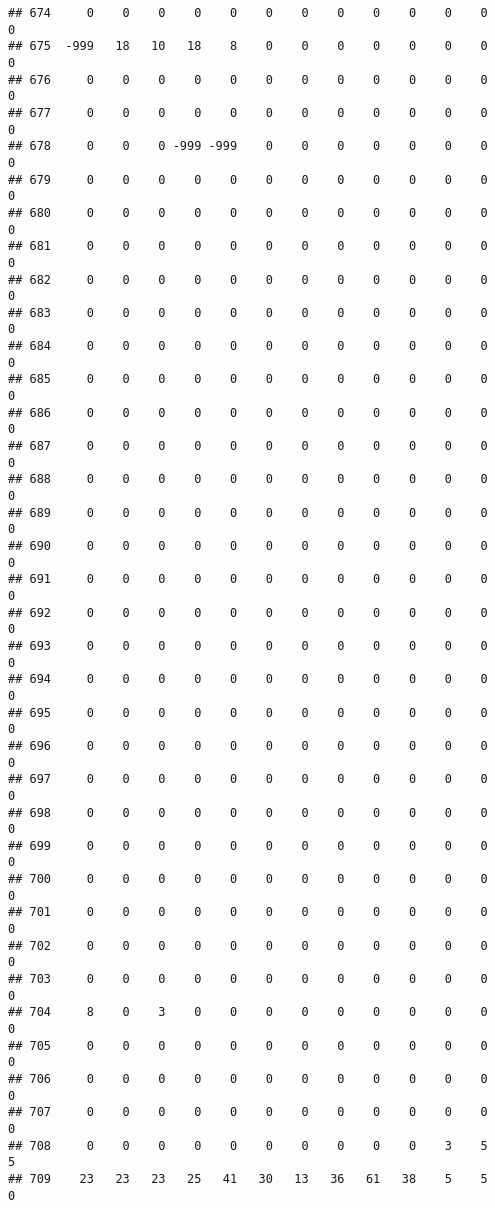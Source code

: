 \documentclass[]{article}
\begin{document}
\begin{verbatim}
## 674     0    0    0    0    0    0    0    0    0    0    0    0    0
## 675  -999   18   10   18    8    0    0    0    0    0    0    0    0
## 676     0    0    0    0    0    0    0    0    0    0    0    0    0
## 677     0    0    0    0    0    0    0    0    0    0    0    0    0
## 678     0    0    0 -999 -999    0    0    0    0    0    0    0    0
## 679     0    0    0    0    0    0    0    0    0    0    0    0    0
## 680     0    0    0    0    0    0    0    0    0    0    0    0    0
## 681     0    0    0    0    0    0    0    0    0    0    0    0    0
## 682     0    0    0    0    0    0    0    0    0    0    0    0    0
## 683     0    0    0    0    0    0    0    0    0    0    0    0    0
## 684     0    0    0    0    0    0    0    0    0    0    0    0    0
## 685     0    0    0    0    0    0    0    0    0    0    0    0    0
## 686     0    0    0    0    0    0    0    0    0    0    0    0    0
## 687     0    0    0    0    0    0    0    0    0    0    0    0    0
## 688     0    0    0    0    0    0    0    0    0    0    0    0    0
## 689     0    0    0    0    0    0    0    0    0    0    0    0    0
## 690     0    0    0    0    0    0    0    0    0    0    0    0    0
## 691     0    0    0    0    0    0    0    0    0    0    0    0    0
## 692     0    0    0    0    0    0    0    0    0    0    0    0    0
## 693     0    0    0    0    0    0    0    0    0    0    0    0    0
## 694     0    0    0    0    0    0    0    0    0    0    0    0    0
## 695     0    0    0    0    0    0    0    0    0    0    0    0    0
## 696     0    0    0    0    0    0    0    0    0    0    0    0    0
## 697     0    0    0    0    0    0    0    0    0    0    0    0    0
## 698     0    0    0    0    0    0    0    0    0    0    0    0    0
## 699     0    0    0    0    0    0    0    0    0    0    0    0    0
## 700     0    0    0    0    0    0    0    0    0    0    0    0    0
## 701     0    0    0    0    0    0    0    0    0    0    0    0    0
## 702     0    0    0    0    0    0    0    0    0    0    0    0    0
## 703     0    0    0    0    0    0    0    0    0    0    0    0    0
## 704     8    0    3    0    0    0    0    0    0    0    0    0    0
## 705     0    0    0    0    0    0    0    0    0    0    0    0    0
## 706     0    0    0    0    0    0    0    0    0    0    0    0    0
## 707     0    0    0    0    0    0    0    0    0    0    0    0    0
## 708     0    0    0    0    0    0    0    0    0    0    3    5    5
## 709    23   23   23   25   41   30   13   36   61   38    5    5    0

\end{verbatim}
\end{document}
